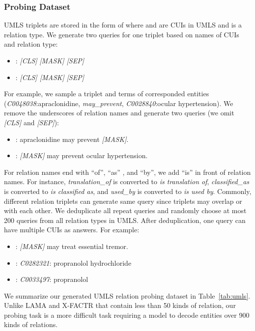 \documentclass[11pt]{article}
\begin{document}
\subsubsection{Probing Dataset}
UMLS triplets are stored in the form of  where  and  are CUIs in UMLS and  is a relation type.
We generate two queries for one triplet based on names of CUIs and relation type:
\begin{itemize}
    \item : \textit{[CLS]}   \textit{[MASK] [SEP]}
    \item : \textit{[CLS] [MASK]}   \textit{[SEP]}
\end{itemize}
For example, we sample a triplet and terms of corresponded entities (\textit{C0048038}:apraclonidine, \textit{may\_prevent}, \textit{C0028840}:ocular hypertension).
We remove the underscores of relation names and generate two queries (we omit \textit{[CLS]} and \textit{[SEP]}):
\begin{itemize}
    \item : apraclonidine may prevent \textit{[MASK]}.
    \item : \textit{[MASK]} may prevent ocular hypertension.
\end{itemize}
For relation names end with ``of'', ``as'' , and ``by'', we add ``is'' in front of relation names.
For instance, \textit{translation\_of} is converted to \textit{is translation of}, \textit{classified\_as} is converted to \textit{is classified as}, and \textit{used\_by} is converted to \textit{is used by}.
Commonly, different relation triplets can generate same query since triplets may overlap  or  with each other.
We deduplicate all repeat queries and randomly choose at most 200 queries from all relation types in UMLS.
After deduplication, one query can have multiple CUIs as answers.
For example:
\begin{itemize}
    \item : \textit{[MASK]} may treat essential tremor.
    \item : \textit{C0282321}: propranolol hydrochloride
    \item : \textit{C0033497}: propranolol
\end{itemize}
We summarize our generated UMLS relation probing dataset in Table~\ref{tab:umls}.
Unlike LAMA \cite{petroni-etal-2019-language} and X-FACTR \cite{jiang-etal-2020-x} that contain less than 50 kinds of relation, our probing task is a more difficult task requiring a model to decode entities over 900 kinds of relations.
\end{document}
